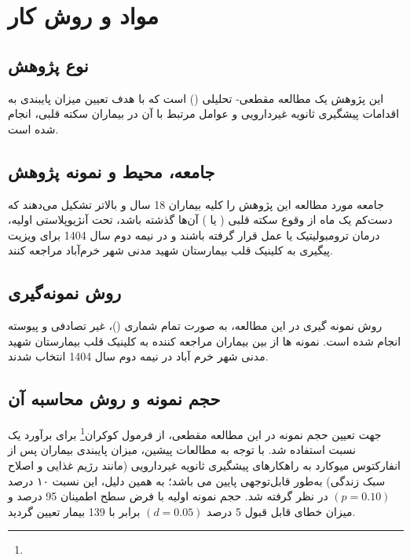 \ChapterStart
\chapter{مواد و روش کار}
\label{ch:methods}

\section{نوع پژوهش}
\label{sec:study-design}

این پژوهش یک مطالعه مقطعی- تحلیلی () است که با هدف تعیین میزان پایبندی به اقدامات پیشگیری ثانویه غیردارویی و عوامل مرتبط با آن در بیماران سکته قلبی، انجام شده است.


\section{جامعه، محیط و نمونه پژوهش}
\label{sec:population}


جامعه مورد مطالعه این پژوهش را کلیه بیماران 18 سال و بالاتر تشکیل می‌دهند که دست‌کم یک ماه از وقوع سکته قلبی ( یا ) آن‌ها گذشته باشد، تحت آنژیوپلاستی اولیه، درمان ترومبولیتیک یا عمل  قرار گرفته باشند و در نیمه دوم سال 1404 برای ویزیت پیگیری به کلینیک قلب بیمارستان شهید مدنی شهر خرم‌آباد مراجعه کنند.



\section{روش نمونه‌گیری}
\label{sec:sampling}


روش نمونه گیری در این مطالعه، به صورت تمام شماری ()، غیر تصادفی و پیوسته انجام شده است. نمونه ها از بین بیماران مراجعه کننده به کلینیک قلب بیمارستان شهید مدنی شهر خرم آباد در نیمه دوم سال 1404 انتخاب شدند.



\section{حجم نمونه و روش محاسبه آن}
\label{sec:sample-size}

جهت تعیین حجم نمونه در این مطالعه مقطعی، از فرمول کوکران\footnote{} برای برآورد یک نسبت استفاده شد. با توجه به مطالعات پیشین، میزان پایبندی بیماران پس از انفارکتوس میوکارد به راهکارهای پیشگیری ثانویه غیردارویی (مانند رژیم غذایی و اصلاح سبک زندگی) به‌طور قابل‌توجهی پایین می باشد؛ به همین دلیل، این نسبت ۱۰ درصد $(p = 0.10)$ در نظر گرفته شد\cite{Sibhatu2025CADPrevention,Najafi2016TelephoneFollowUp}. حجم نمونه اولیه با فرض سطح اطمینان 95 درصد و میزان خطای قابل قبول 5 درصد $(d = 0.05)$ برابر با 139 بیمار تعیین گردید.

